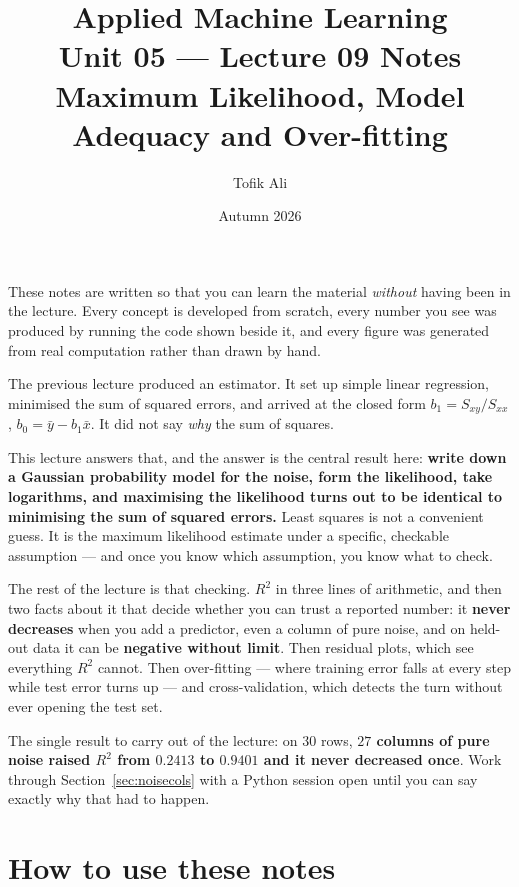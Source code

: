 \documentclass[11pt]{article}
\title{Applied Machine Learning\\Unit 05 --- Lecture 09 Notes\\
       Maximum Likelihood, Model Adequacy and Over-fitting}
\author{Tofik Ali}
\date{Autumn 2026}
\begin{document}
\maketitle

\begin{keyidea}
These notes are written so that you can learn the material \emph{without}
having been in the lecture. Every concept is developed from scratch, every
number you see was produced by running the code shown beside it, and every
figure was generated from real computation rather than drawn by hand.

The previous lecture produced an estimator. It set up simple linear
regression, minimised the sum of squared errors, and arrived at the closed
form $b_1 = S_{xy}/S_{xx}$, $b_0 = \bar y - b_1\bar x$. It did not say
\emph{why} the sum of squares.

This lecture answers that, and the answer is the central result here:
\textbf{write down a Gaussian probability model for the noise, form the
likelihood, take logarithms, and maximising the likelihood turns out to be
identical to minimising the sum of squared errors.} Least squares is not a
convenient guess. It is the maximum likelihood estimate under a specific,
checkable assumption --- and once you know which assumption, you know what to
check.

The rest of the lecture is that checking. $R^2$ in three lines of arithmetic,
and then two facts about it that decide whether you can trust a reported
number: it \textbf{never decreases} when you add a predictor, even a column of
pure noise, and on held-out data it can be \textbf{negative without limit}.
Then residual plots, which see everything $R^2$ cannot. Then over-fitting ---
where training error falls at every step while test error turns up --- and
cross-validation, which detects the turn without ever opening the test set.

The single result to carry out of the lecture: on $30$ rows,
\textbf{$27$ columns of pure noise raised $R^2$ from $0.2413$ to $0.9401$ and
it never decreased once}. Work through Section~\ref{sec:noisecols} with a
Python session open until you can say exactly why that had to happen.
\end{keyidea}

{\small\tableofcontents}
\medskip

\section{How to use these notes}
\label{sec:how}
\end{document}
